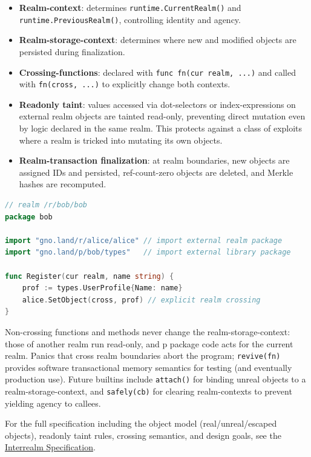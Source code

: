 \documentclass[12pt,a4paper]{article}
\providecommand{\tightlist}{\setlength{\itemsep}{0pt}\setlength{\parskip}{0pt}}
\newcommand{\passthrough}[1]{#1}
\begin{document}
\begin{itemize}
\tightlist
\item
  \textbf{Realm-context}: determines
  \passthrough{\lstinline!runtime.CurrentRealm()!} and
  \passthrough{\lstinline!runtime.PreviousRealm()!}, controlling
  identity and agency.
\item
  \textbf{Realm-storage-context}: determines where new and modified
  objects are persisted during finalization.
\item
  \textbf{Crossing-functions}: declared with
  \passthrough{\lstinline!func fn(cur realm, ...)!} and called with
  \passthrough{\lstinline!fn(cross, ...)!} to explicitly change both
  contexts.
\item
  \textbf{Readonly taint}: values accessed via dot-selectors or
  index-expressions on external realm objects are tainted read-only,
  preventing direct mutation even by logic declared in the same realm.
  This protects against a class of exploits where a realm is tricked
  into mutating its own objects.
\item
  \textbf{Realm-transaction finalization}: at realm boundaries, new
  objects are assigned IDs and persisted, ref-count-zero objects are
  deleted, and Merkle hashes are recomputed.
\end{itemize}

\begin{lstlisting}[language=Go]
// realm /r/bob/bob
package bob

import "gno.land/r/alice/alice" // import external realm package
import "gno.land/p/bob/types"   // import external library package

func Register(cur realm, name string) {
    prof := types.UserProfile{Name: name}
    alice.SetObject(cross, prof) // explicit realm crossing
}
\end{lstlisting}

Non-crossing functions and methods never change the
realm-storage-context: those of another realm run read-only, and p
package code acts for the current realm. Panics that cross realm boundaries abort the program;
\passthrough{\lstinline!revive(fn)!} provides software transactional
memory semantics for testing (and eventually production use). Future
builtins include \passthrough{\lstinline!attach()!} for binding unreal
objects to a realm-storage-context, and
\passthrough{\lstinline!safely(cb)!} for clearing realm-contexts to
prevent yielding agency to callees.

For the full specification including the object model
(real/unreal/escaped objects), readonly taint rules, crossing semantics,
and design goals, see the
\href{./resources/gno-interrealm.md}{Interrealm Specification}.
\end{document}
